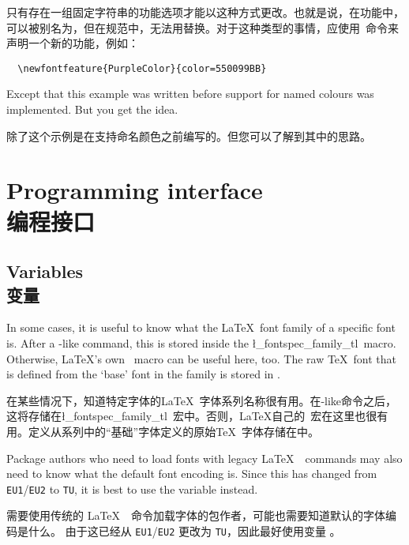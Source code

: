 \documentclass[a4paper]{l3doc}
\begin{document}
只有存在一组固定字符串的功能选项才能以这种方式更改。也就是说，在功能中，可以被别名为，但在规范中，无法用替换。对于这种类型的事情，应使用\cmd\newfontfeature\ 命令来声明一个新的功能，例如：
\begin{Verbatim}
  \newfontfeature{PurpleColor}{color=550099BB}
\end{Verbatim}
Except that this example was written before support for named colours was
implemented. But you get the idea.

除了这个示例是在支持命名颜色之前编写的。但您可以了解到其中的思路。

\section{Programming interface\\编程接口}
\label{sec:api}

\subsection{Variables\\变量}

In some cases, it is useful to know what the \LaTeX\ font family
of a specific  font is. After a \cmd\fontspec-like
command, this is stored inside the \cmd\l_fontspec_family_tl\ macro.
Otherwise, \LaTeX's own \cmd\f@family\ macro can be useful here,
too.
The raw \TeX\ font that is defined from the `base' font in the family is stored in .

在某些情况下，知道特定字体的\LaTeX\ 字体系列名称很有用。在\cmd\fontspec-like命令之后，这将存储在\cmd\l_fontspec_family_tl\ 宏中。否则，\LaTeX 自己的\cmd\f@family\ 宏在这里也很有用。定义从系列中的“基础”字体定义的原始\TeX\ 字体存储在中。

Package authors who need to load fonts with legacy \LaTeX\ \NFSS\ commands may also need to know what the default font encoding is.
Since this has changed from \texttt{EU1}/\texttt{EU2} to \texttt{TU}, it is best to use the variable  instead.

需要使用传统的 \LaTeX\ \NFSS\ 命令加载字体的包作者，可能也需要知道默认的字体编码是什么。
由于这已经从 \texttt{EU1}/\texttt{EU2} 更改为 \texttt{TU}，因此最好使用变量 。
\end{document}

